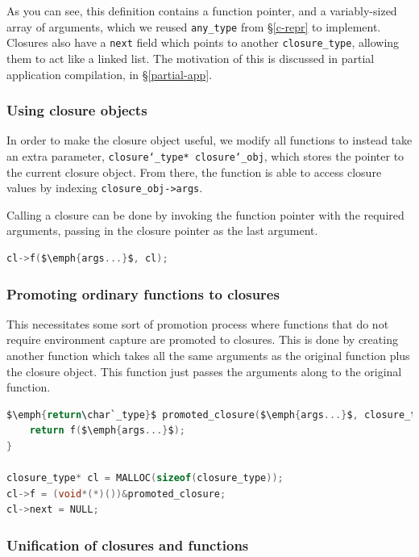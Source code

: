 As you can see, this definition contains a function pointer, and a
variably-sized array of arguments, which we reused \verb|any_type| from
\S\ref{c-repr} to implement. Closures also have a \texttt{next} field which
points to another \verb|closure_type|, allowing them to act like a linked list.
The motivation of this is discussed in partial application compilation, in
\S\ref{partial-app}.

\subsubsection{Using closure objects}

In order to make the closure object useful, we modify all functions to instead
take an extra parameter, \texttt{closure\char`_type* closure\char`_obj}, which
stores the pointer to the current closure object. From there, the function is
able to access closure values by indexing \verb|closure_obj->args|.

Calling a closure can be done by invoking the function pointer with the 
required arguments, passing in the closure pointer as the last argument.

\begin{lstlisting}[language=C]
cl->f($\emph{args...}$, cl);
\end{lstlisting}

\subsubsection{Promoting ordinary functions to closures}

This necessitates some sort of promotion process where functions that do not
require environment capture are promoted to closures. This is done by creating
another function which takes all the same arguments as the original function
plus the closure object. This function just passes the arguments along to the
original function.

\begin{lstlisting}[language=C]
$\emph{return\char`_type}$ promoted_closure($\emph{args...}$, closure_type* closure_obj) {
    return f($\emph{args...}$);
}

closure_type* cl = MALLOC(sizeof(closure_type));
cl->f = (void*(*)())&promoted_closure;
cl->next = NULL;
\end{lstlisting}

\subsubsection{Unification of closures and functions}

